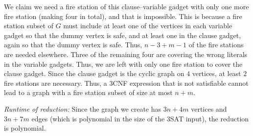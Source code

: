\documentclass[12 pt, letterpaper]{hmcpset}
\begin{document}
\begin{solution}
	We claim we need a fire station of this clause--variable gadget with only one more fire station (making four in total), and that is impossible. This is because a fire station subset of $G$ must include at least one of the vertices in each variable gadget so that the dummy vertex is safe, and at least one in the clause gadget, again so that the dummy vertex is safe. Thus, $n - 3 + m - 1$ of the fire stations are needed elsewhere. Three of the remaining four are covering the wrong literals in the variable gadgets. Thus, we are left with only one fire station to cover the clause gadget. Since the clause gadget is the cyclic graph on $4$ vertices, at least $2$ fire stations are necessary. Thus, a 3CNF expression that is not satisfiable cannot lead to a graph with a fire station subset of size at most $n + m$.

	\emph{Runtime of reduction:} Since the graph we create has $3n + 4m$ vertices and $3n + 7m$ edges (which is polynomial in the size of the 3SAT input), the reduction is polynomial.
\end{solution}
\end{document}

